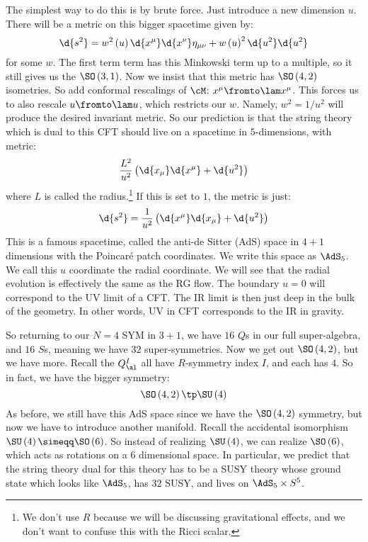 \documentclass{booc}
\begin{document}
The simplest way to do this is by brute force. Just introduce a new dimension $u$. 
There will be a metric on this bigger spacetime given by:
\begin{equation}
\d{s^2} = 
w^2\left( u \right)
\d{x^\mu}\d{x^\nu} \eta_{\mu\nu}
+
w\left( u \right)^2 \d{u^2}
\d{u^2}
\end{equation}
for some $w$. The first term term has this Minkowski term up to a multiple, 
so it still gives us the $\SO\left( 3,1 \right)$. 
Now we insist that this metric has $\SO\left( 4,2 \right)$ isometries. 
So add conformal rescalings of $\cM$: $x^\mu \fromto \lam x^\mu$. 
This forces us to also rescale $u\fromto \lam u$, 
which restricts our $w$. Namely, $w^2 = 1/ u^2$
will produce the desired invariant metric. 
So our prediction is that the string theory which is dual to this CFT should live
on a spacetime in $5$-dimensions, with metric:
\begin{equation}
\frac{L^2}{u^2} \left( \d{x_\mu}\d{x^\mu} + \d{u^2} \right)
\end{equation}
where $L$ is called the radius.\footnote{
We don't use $R$ because we will be discussing gravitational effects, and we
don't want to confuse this with the Ricci scalar.}
If this is set to $1$, the metric is just:
\begin{equation}
\d{s^2} = \frac{1}{u^2}\left( 
\d{x^\mu} \d{x_\mu} + \d{u^2}\right)
\end{equation}
This is a famous spacetime, called the anti-de Sitter (AdS) space in $4+1$ dimensions
with the Poincar\'e patch coordinates. We write this space as $\AdS_5$.
We call this $u$ coordinate the radial coordinate. 
We will see that the radial evolution is effectively the same as the RG flow.
The boundary $u = 0$ will correspond to the UV limit of a CFT. 
The IR limit is then just deep in the bulk of the geometry.
In other words, UV in CFT corresponds to the IR in gravity.

So returning to our $N = 4$ SYM in $3 +1$, we have $16$ $Q$s in our full super-algebra, 
and $16$ $S$s, meaning we have $32$ super-symmetries.
Now we get out $\SO\left( 4,2 \right)$, but we have more. 
Recall the $Q^I_\al$ all have $R$-symmetry index $I$, and each has $4$. 
So in fact, we have the bigger symmetry:
\begin{equation}
\SO\left( 4,2 \right) \tp \SU\left( 4 \right)
\end{equation}
As before, we still have this AdS space since we have the $\SO\left( 4,2 \right)$ symmetry, 
but now we have to introduce another manifold. 
Recall the accidental isomorphism $\SU\left( 4 \right) \simeqq \SO\left( 6 \right)$.
So instead of realizing $\SU\left( 4 \right)$, we can realize $\SO\left( 6 \right)$, 
which acts as rotations on a $6$ dimensional space. 
In particular, we predict that the string theory dual for this theory has
to be a SUSY theory whose ground state which looks like $\AdS_5$, has $32$ SUSY, 
and lives on $\AdS_5 \times S^5$. 
\end{document}
